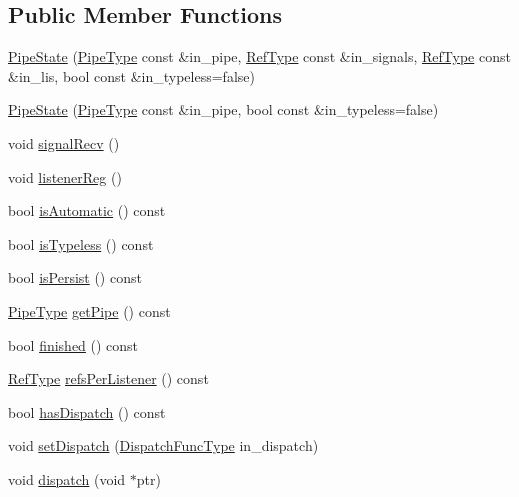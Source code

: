 \subsection*{Public Member Functions}
\begin{DoxyCompactItemize}
\item 
\hyperlink{structvt_1_1pipe_1_1_pipe_state_abbddca53ca44e4417c347235968c7ad9}{Pipe\+State} (\hyperlink{namespacevt_ac9852acda74d1896f48f406cd72c7bd3}{Pipe\+Type} const \&in\+\_\+pipe, \hyperlink{namespacevt_a9b39ce9494bb04674d0d5b895a5aa50f}{Ref\+Type} const \&in\+\_\+signals, \hyperlink{namespacevt_a9b39ce9494bb04674d0d5b895a5aa50f}{Ref\+Type} const \&in\+\_\+lis, bool const \&in\+\_\+typeless=false)
\item 
\hyperlink{structvt_1_1pipe_1_1_pipe_state_a2f6a2a7f657b0938d0214fc16b65969c}{Pipe\+State} (\hyperlink{namespacevt_ac9852acda74d1896f48f406cd72c7bd3}{Pipe\+Type} const \&in\+\_\+pipe, bool const \&in\+\_\+typeless=false)
\item 
void \hyperlink{structvt_1_1pipe_1_1_pipe_state_a3cd72e7d91b3752e2cb19bc42b7de397}{signal\+Recv} ()
\item 
void \hyperlink{structvt_1_1pipe_1_1_pipe_state_acfbe1dc3cac73153543a394b4f8add35}{listener\+Reg} ()
\item 
bool \hyperlink{structvt_1_1pipe_1_1_pipe_state_ada2a4221edc09264da146ff158e37d3c}{is\+Automatic} () const
\item 
bool \hyperlink{structvt_1_1pipe_1_1_pipe_state_a0e20b860728e1aded738be02074c5861}{is\+Typeless} () const
\item 
bool \hyperlink{structvt_1_1pipe_1_1_pipe_state_a8922ec696ab8a01651a53011a548b067}{is\+Persist} () const
\item 
\hyperlink{namespacevt_ac9852acda74d1896f48f406cd72c7bd3}{Pipe\+Type} \hyperlink{structvt_1_1pipe_1_1_pipe_state_ab69e2e4c5783a5df48087fdb436a7a2f}{get\+Pipe} () const
\item 
bool \hyperlink{structvt_1_1pipe_1_1_pipe_state_a593b2ce5b04ce3e4234654f454868434}{finished} () const
\item 
\hyperlink{namespacevt_a9b39ce9494bb04674d0d5b895a5aa50f}{Ref\+Type} \hyperlink{structvt_1_1pipe_1_1_pipe_state_a4e0c0ff9eebf70c05e283474fdbdeb14}{refs\+Per\+Listener} () const
\item 
bool \hyperlink{structvt_1_1pipe_1_1_pipe_state_adbd64a53d60cfe18a7c9994cf2af901b}{has\+Dispatch} () const
\item 
void \hyperlink{structvt_1_1pipe_1_1_pipe_state_a436083ce72366f0bece034065bb3aca1}{set\+Dispatch} (\hyperlink{structvt_1_1pipe_1_1_pipe_state_ad81b637847d9c3185420c58c9272ed7d}{Dispatch\+Func\+Type} in\+\_\+dispatch)
\item 
void \hyperlink{structvt_1_1pipe_1_1_pipe_state_a1e2aea22713ea6b745323f6b3f82b6ed}{dispatch} (void $\ast$ptr)
\end{DoxyCompactItemize}


